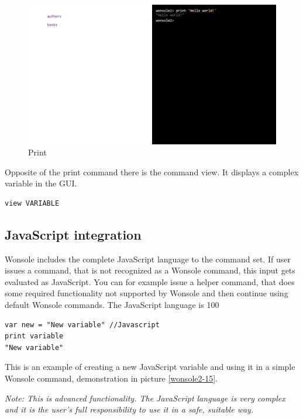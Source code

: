 \begin{figure}
\centering
\includegraphics[width=\textwidth]{../../manual/screenshot/wonsole2/wonsole2-10.png}
\caption{Print}
\label{wonsole2-10}
\end{figure}

Opposite of the print command there is the command view. It displays a complex variable in
the GUI.
\begin{verbatim}
view VARIABLE
\end{verbatim}

\subsection{JavaScript integration}
Wonsole includes the complete JavaScript language to the command set. If user issues
a command, that is not recognized as a Wonsole command, this input gets
evaluated as JavaScript. You can for example issue a helper command, that does
some required functionality not supported by Wonsole and then continue using
default Wonsole commands. The JavaScript language is 100%

\begin{verbatim}
var new = "New variable" //Javascript
print variable
"New variable"
\end{verbatim}

This is an example of creating a new JavaScript variable and using it in a simple
Wonsole command, demonstration in picture \ref{wonsole2-15}.

\textit{Note: This is advanced functionality. The JavaScript language is very
complex and it is the user's full responsibility to use it in a safe, suitable
way.}
 

